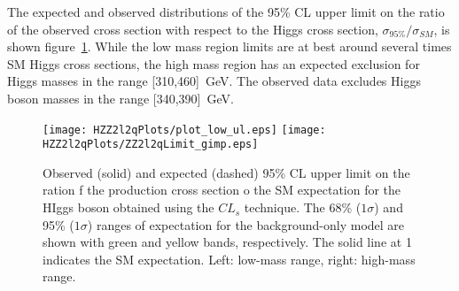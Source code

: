 The expected and observed  distributions of the 
95\% CL upper limit on the ratio of the observed cross section
with respect to the Higgs cross section,
$\sigma_{95\%}/\sigma_{SM}$, is shown 
figure~\ref{fig:HZZ2l2qLimits}.  While the low mass region
limits are at best around several times SM Higgs cross sections, 
the high mass region has an expected exclusion for Higgs masses 
in the range [310,460]~GeV. The observed data excludes Higgs boson 
masses in the range [340,390]~GeV.

\begin{figure}
\begin{center}
\texttt{[image: HZZ2l2qPlots/plot\_low\_ul.eps]}
\texttt{[image: HZZ2l2qPlots/ZZ2l2qLimit\_gimp.eps]}
\caption{Observed (solid) and expected (dashed) 95\% CL upper limit on
the ration f the production cross section o the SM expectation for the 
HIggs boson obtained using the $CL_s$ technique.  The 68\% ($1\sigma$) 
and 95\% ($1\sigma$) ranges of expectation for the background-only model
are shown with green and yellow bands, respectively.  The solid line at 
1 indicates the SM expectation.  Left: low-mass range, right: high-mass
range. }
\label{fig:HZZ2l2qLimits}
\end{center}
\end{figure}


